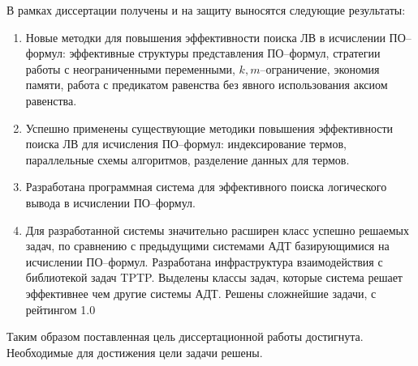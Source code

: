 В рамках диссертации получены и на защиту выносятся следующие результаты:
\begin{enumerate}
\item Новые методки для повышения эффективности поиска ЛВ в исчислении ПО--формул: эффективные структуры представления ПО--формул,  стратегии работы с неограниченными переменными, $k,m$--ограничение, экономия памяти, работа с предикатом равенства без явного использования аксиом равенства.

\item Успешно применены существующие методики повышения эффективности поиска ЛВ для исчисления ПО--формул: индексирование термов, параллельные схемы алгоритмов, разделение данных для термов.

\item Разработана программная система для эффективного поиска логического вывода в исчислении ПО--формул.

\item Для разработанной системы значительно расширен класс успешно решаемых задач, по сравнению с предыдущими системами АДТ базирующимися на исчислении ПО--формул. Разработана инфраструктура взаимодействия с библиотекой задач TPTP. Выделены классы задач, которые система решает эффективнее чем другие системы АДТ. Решены сложнейшие задачи, с рейтингом 1.0
\end{enumerate}

Таким образом поставленная цель диссертационной работы достигнута. Необходимые для достижения цели задачи решены.


